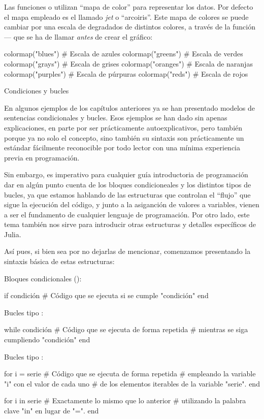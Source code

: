 ﻿\documentclass[spanish]{article}
\begin{document}
Las funciones  o  utilizan ``mapa de color'' para representar los datos. Por defecto el mapa empleado es el llamado \emph{jet} o ``arcoiris''. Este mapa de colores se puede cambiar por una escala de degradados de distintos colores, a través de la función  --- que se ha de llamar \emph{antes} de crear el gráfico:

colormap("blues")   # Escala de azules
colormap("greens")  # Escala de verdes
colormap("grays")   # Escala de grises
colormap("oranges") # Escala de naranjas
colormap("purples") # Escala de púrpuras
colormap("reds")    # Escala de rojos


Condiciones y bucles

En algunos ejemplos de los capítulos anteriores ya se han presentado modelos de sentencias condicionales y bucles. Esos ejemplos se han dado sin apenas explicaciones, en parte por ser prácticamente autoexplicativos, pero también porque ya no solo el concepto, sino también su sintaxis son prácticamente un estándar fácilmente reconocible por todo lector con una mínima experiencia previa en programación.

Sin embargo, es imperativo para cualquier guía introductoria de programación dar en algún punto cuenta de los bloques condicioneales y los distintos tipos de bucles, ya que estamos hablando de las estructuras que controlan el ``flujo'' que sigue la ejecución del código, y junto a la asiganción de valores a variables, vienen a ser el fundamento de cualquier lenguaje de programación. Por otro lado, este tema también nos sirve para introducir otras estructuras y detalles específicos de Julia.

Así pues, si bien sea por no dejarlas de mencionar, comenzamos presentando la sintaxis básica de estas estructuras:

Bloques condicionales ():

if condición
  # Código que se ejecuta si se cumple "condición"
end

Bucles tipo :

while condición
  # Código que se ejecuta de forma repetida
  # mientras se siga cumpliendo "condición"
end

Bucles tipo :

for i = serie
  # Código que se ejecuta de forma repetida
  # empleando la variable "i" con el valor de cada uno
  # de los elementos iterables de la variable "serie".
end

for i in serie
  # Exactamente lo mismo que lo anterior
  # utilizando la palabra clave "in" en lugar de "=".
end
\end{document}
